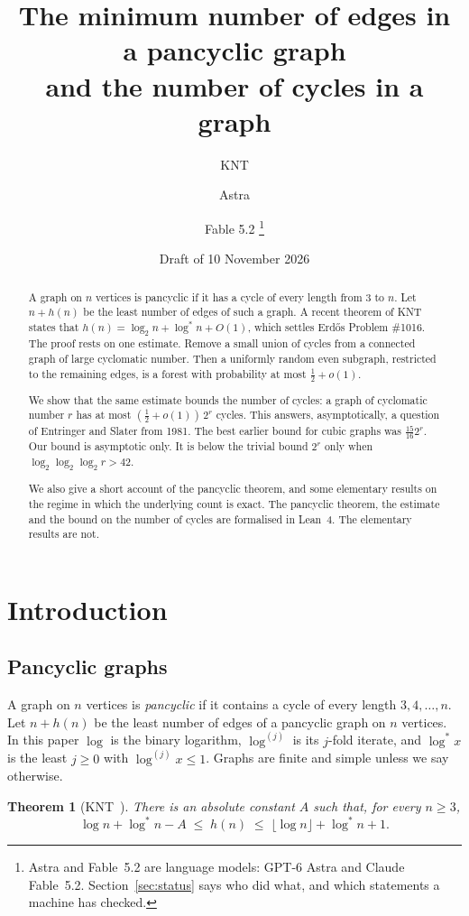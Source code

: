 \documentclass[11pt]{article}
\title{The minimum number of edges in a pancyclic graph\\ and the number of cycles in a graph}
\author{KNT \and Astra \and Fable 5.2%
\thanks{Astra and Fable~5.2 are language models: GPT-6 Astra and Claude Fable~5.2.
Section~\ref{sec:status} says who did what, and which statements a machine has checked.}}
\date{Draft of 10 November 2026}
\newtheorem{theorem}{Theorem}[section]
\theoremstyle{definition}
\theoremstyle{remark}
\newcommand{\lgs}{\log^{*}}
\newcommand{\lgk}[1]{\log^{(#1)}}
\newcommand{\half}{\tfrac12}
\begin{document}
\maketitle

\begin{abstract}
A graph on $n$ vertices is pancyclic if it has a cycle of every length from $3$ to $n$. Let $n+h(n)$
be the least number of edges of such a graph. A recent theorem of KNT states that
$h(n)=\log_2 n+\lgs n+O(1)$, which settles Erd\H{o}s Problem \#1016. The proof rests on one estimate. Remove a small union of cycles
from a connected graph of large cyclomatic number. Then a uniformly random even subgraph, restricted
to the remaining edges, is a forest with probability at most $\half+o(1)$.

We show that the same estimate bounds the number of cycles: a graph of cyclomatic number $r$ has at
most $(\half+o(1))\,2^{r}$ cycles. This answers, asymptotically, a question of Entringer and Slater
from 1981. The best earlier bound for cubic graphs was $\frac{15}{16}2^{r}$. Our bound is asymptotic
only. It is below the trivial bound $2^{r}$ only when $\log_2\log_2\log_2 r>42$.

We also give a short account of the pancyclic theorem, and some elementary results on the regime in
which the underlying count is exact. The pancyclic theorem, the estimate and the bound on the number
of cycles are formalised in Lean~4. The elementary results are not.
\end{abstract}

\section{Introduction}\label{sec:intro}

\subsection{Pancyclic graphs}

A graph on $n$ vertices is \emph{pancyclic} if it contains a cycle of every length $3,4,\dots,n$.
Let $n+h(n)$ be the least number of edges of a pancyclic graph on $n$ vertices. In this paper $\log$
is the binary logarithm, $\lgk{j}$ is its $j$-fold iterate, and $\lgs x$ is the least $j\ge0$ with
$\lgk{j}x\le1$. Graphs are finite and simple unless we say otherwise.

\begin{theorem}[KNT~\cite{KNT}]\label{thm:main}
There is an absolute constant $A$ such that, for every $n\ge3$,
\[
  \log n+\lgs n-A\;\le\;h(n)\;\le\;\lfloor\log n\rfloor+\lgs n+1 .
\]
\end{theorem}
\end{document}

